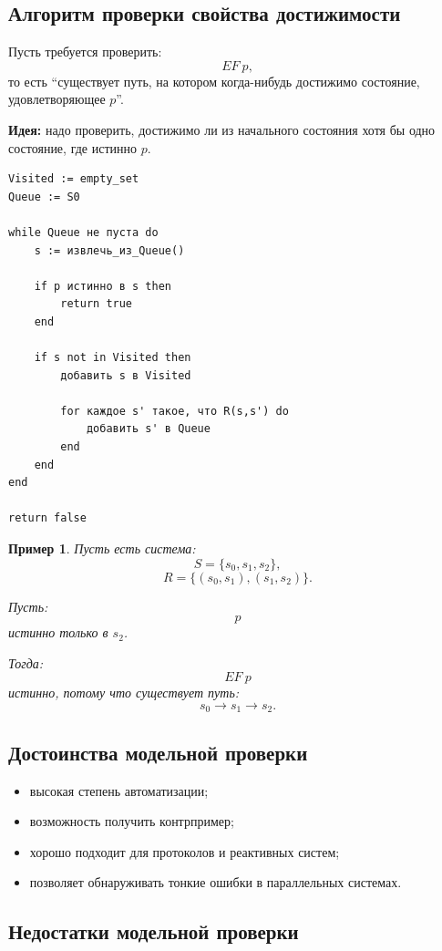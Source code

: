 \documentclass[12pt,a4paper]{article}
\newtheorem{example}{Пример}
\begin{document}
\subsection{Алгоритм проверки свойства достижимости}

Пусть требуется проверить:
\[
    EF\ p,
\]
то есть ``существует путь, на котором когда-нибудь достижимо состояние, удовлетворяющее $p$''.

\textbf{Идея:}
надо проверить, достижимо ли из начального состояния хотя бы одно состояние, где истинно $p$.

\begin{lstlisting}[style=pseudo]
Visited := empty_set
Queue := S0

while Queue не пуста do
    s := извлечь_из_Queue()

    if p истинно в s then
        return true
    end

    if s not in Visited then
        добавить s в Visited

        for каждое s' такое, что R(s,s') do
            добавить s' в Queue
        end
    end
end

return false
\end{lstlisting}

\begin{example}
Пусть есть система:
\[
    S = \{s_0,s_1,s_2\},
\]
\[
    R = \{(s_0,s_1),(s_1,s_2)\}.
\]

Пусть:
\[
    p
\]
истинно только в $s_2$.

Тогда:
\[
    EF\ p
\]
истинно, потому что существует путь:
\[
    s_0 \to s_1 \to s_2.
\]
\end{example}

\subsection{Достоинства модельной проверки}

\begin{itemize}
    \item высокая степень автоматизации;
    \item возможность получить контрпример;
    \item хорошо подходит для протоколов и реактивных систем;
    \item позволяет обнаруживать тонкие ошибки в параллельных системах.
\end{itemize}

\subsection{Недостатки модельной проверки}
\end{document}
